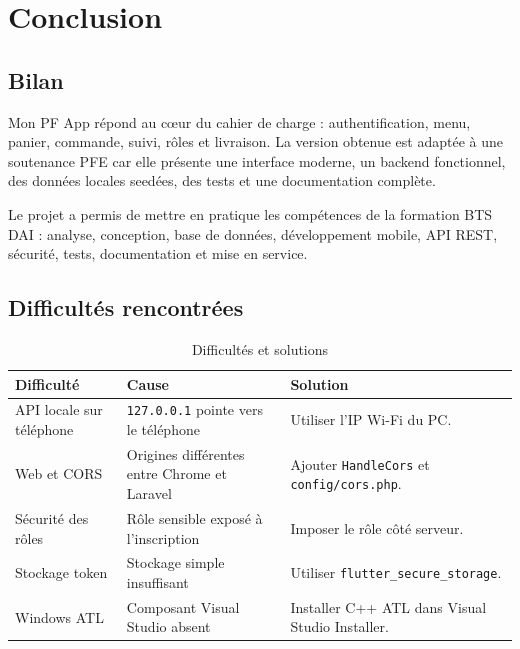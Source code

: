 \documentclass[12pt,a4paper]{report}
\begin{document}
\chapter{Conclusion}
\section{Bilan}
Mon PF App répond au cœur du cahier de charge : authentification, menu, panier, commande, suivi, rôles et livraison. La version obtenue est adaptée à une soutenance PFE car elle présente une interface moderne, un backend fonctionnel, des données locales seedées, des tests et une documentation complète.

Le projet a permis de mettre en pratique les compétences de la formation BTS DAI : analyse, conception, base de données, développement mobile, API REST, sécurité, tests, documentation et mise en service.

\section{Difficultés rencontrées}
\begin{longtable}{p{4cm}p{5cm}p{5cm}}
\caption{Difficultés et solutions}\\
\toprule
\textbf{Difficulté} & \textbf{Cause} & \textbf{Solution}\\
\midrule
API locale sur téléphone & \texttt{127.0.0.1} pointe vers le téléphone & Utiliser l'IP Wi-Fi du PC.\\
Web et CORS & Origines différentes entre Chrome et Laravel & Ajouter \texttt{HandleCors} et \texttt{config/cors.php}.\\
Sécurité des rôles & Rôle sensible exposé à l'inscription & Imposer le rôle côté serveur.\\
Stockage token & Stockage simple insuffisant & Utiliser \texttt{flutter\_secure\_storage}.\\
Windows ATL & Composant Visual Studio absent & Installer C++ ATL dans Visual Studio Installer.\\
\bottomrule
\end{longtable}
\end{document}
